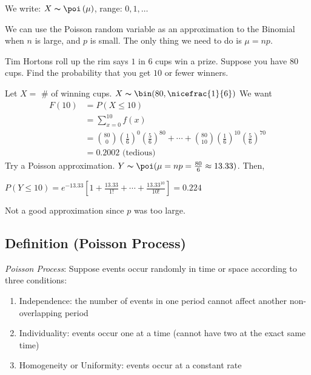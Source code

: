 We write: $ X \thicksim \poi\left(\mu\right) $, range: $ 0,1,\ldots $

We can use the Poisson random variable as an approximation to the Binomial
when $ n $ is large, and $ p $ is small. The only thing we need to do
is $ \mu=np $.


Tim Hortons roll up the rim says $ 1 $ in $ 6 $ cups win a prize. Suppose
you have $ 80 $ cups. Find the probability that you get $ 10 $ or fewer
winners.

Let $ X= $ \# of winning cups. $ X \thicksim \bin(80,\nicefrac{1}{6}) $
We want
\begin{align*}
    F(10)&=P(X\le 10)\\
    &=\sum\limits_{x=0}^{10} f(x)\\
    &=\binom{80}{0}\left(\frac{1}{6}\right)^0\left(\frac{5}{6}\right)^{80}+\cdots+
    \binom{80}{10}\left(\frac{1}{6}\right)^{10}\left(\frac{5}{6}\right)^{70}\\
    &=0.2002 \text{ (tedious) }
\end{align*}
Try a Poisson approximation.
$ Y \thicksim \poi(\mu=np=\frac{80}{6}\approx 13.33) $. Then, 

$ P(Y\le 10)=e^{-13.33}\left[1+\frac{13.33}{1!}+\cdots+\frac{13.33^{10}}{10!}\right]=0.224 $

Not a good approximation since $ p $ was too large.


\begin{defbox}
    \subsection{Definition (Poisson Process)}
    \emph{Poisson Process}:
    Suppose events occur randomly in time or space according to three conditions:
    \begin{enumerate}[(1)]
        \item Independence: the number of events in one period cannot affect another non-overlapping period
        \item Individuality: events occur one at a time (cannot have two at the exact same time)
        \item Homogeneity or Uniformity: events occur at a constant rate
    \end{enumerate}
\end{defbox}